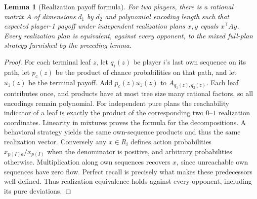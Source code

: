 \documentclass[11pt]{article}
\newtheorem{lemma}[theorem]{Lemma}
\theoremstyle{definition}
\begin{document}
\begin{lemma}[Realization payoff formula]
For two players, there is a rational matrix $A$ of dimensions $d_1$ by $d_2$
and polynomial encoding length such that expected player-1 payoff under
independent realization plans $x,y$ equals $x^{\mathsf T}Ay$.
Every realization plan is equivalent, against every opponent, to the mixed
full-plan strategy furnished by the preceding lemma.
\end{lemma}
\begin{proof}
For each terminal leaf $z$, let $q_i(z)$ be player $i$'s last own sequence
on its path, let $p_c(z)$ be the product of chance probabilities on that path,
and let $u_1(z)$ be the terminal payoff. Add $p_c(z)u_1(z)$ to
$A_{q_1(z),q_2(z)}$. Each leaf contributes once, and products have at most tree
size many rational factors, so all encodings remain polynomial.
For independent pure plans the reachability indicator of a leaf is exactly
the product of the corresponding two $0$--$1$ realization coordinates.
Linearity in mixtures proves the formula for the decompositions. A behavioral
strategy yields the same own-sequence products and thus the same realization
vector. Conversely any $x\in R_i$ defines action probabilities
$x_{p(I)a}/x_{p(I)}$ when the denominator is positive, and arbitrary probabilities
otherwise. Multiplication along own sequences recovers $x$, since unreachable
own sequences have zero flow. Perfect recall is precisely what makes these
predecessors well defined. Thus realization equivalence holds against every
opponent, including its pure deviations.
\end{proof}
\end{document}
